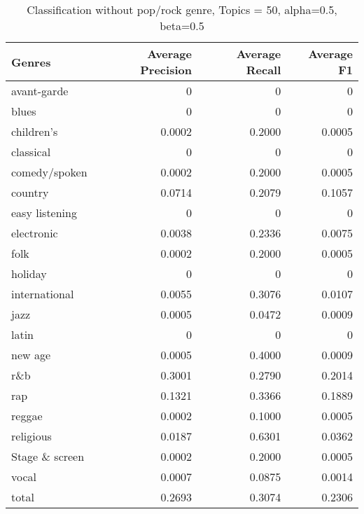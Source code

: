 \begin{table}[h]
\begin{tabular}{|l|r|r|r|}

\hline
\textbf{Genres} &  \textbf{Average Precision} & \textbf{Average Recall} & \textbf{Average F1} \\
\hline
avant-garde	&	0 &	0 &	0\\
blues		&	0 &	0 &	0\\
children's	&	0.0002 &	0.2000 &	0.0005\\
classical	&	0 &	0 &	0\\
comedy/spoken	&	0.0002 &	0.2000 &	0.0005\\
country		&	0.0714 &	0.2079 &	0.1057\\
easy listening	&	0 &	0 &	0\\
electronic	&	0.0038 &	0.2336 &	0.0075\\
folk		&	0.0002 &	0.2000 &	0.0005\\
holiday		&	0 & 	0 &	0\\
international	&	0.0055 &	0.3076 &	0.0107\\
jazz		&	0.0005 &	0.0472 &	0.0009\\
latin		&	0 &	0 &	0\\
new age		&	0.0005 &	0.4000 &	0.0009\\
r\&b		&	0.3001 & 	0.2790 &	0.2014\\
rap		&	0.1321 &	0.3366 &	0.1889\\
reggae		&	0.0002 &	0.1000 &	0.0005\\
religious	&	0.0187 &	0.6301 &	0.0362\\
Stage \& screen	&	0.0002 &	0.2000 &	0.0005\\
vocal		&	0.0007 &	0.0875 &	0.0014\\
total		&	0.2693 &	0.3074 &	0.2306\\
\hline
\end{tabular}
\caption{Classification without pop/rock genre, Topics = 50, alpha=0.5, beta=0.5}
\end{table}